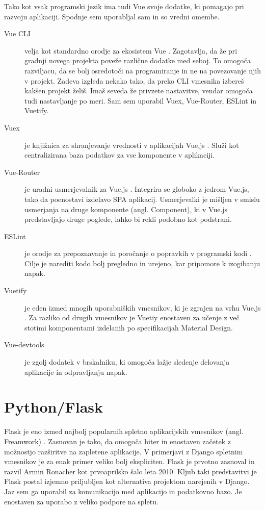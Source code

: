 \documentclass[a4paper, 12pt]{book}
\begin{document}
Tako kot vsak programski jezik ima tudi Vue svoje dodatke, ki pomagajo pri razvoju aplikaciji. Spodnje sem uporabljal sam in so vredni omembe.
\begin{description}
\item[Vue CLI] velja kot standardno orodje za ekosistem Vue \cite{VueCLI}. Zagotavlja, da že pri gradnji novega projekta poveže različne dodatke med seboj. To omogoča razviljacu, da se bolj osredotoči na programiranje in ne na povezovanje njih v projekt. Zadeva izgleda nekako tako, da preko CLI vmesnika izbereš kakšen projekt želiš. Imaš seveda že privzete nastavitve, vendar omogoča tudi nastavljanje po meri. Sam sem uporabil Vuex, Vue-Router, ESLint in Vuetify.
\item[Vuex] je knjižnica za shranjevanje vrednosti v aplikacijah Vue.js \cite{Vuex}. Služi kot centralizirana baza podatkov za vse komponente v aplikaciji. 
\item[Vue-Router] je uradni usmerjevalnik za Vue.js \cite{VueRouter}. Integrira se globoko z jedrom Vue.js, tako da poenostavi izdelavo SPA aplikacij. Usmerjevalki je mišljen v smislu usmerjanja na druge komponente (angl. Component), ki v Vue.js predstavljajo druge poglede, lahko bi rekli podobno kot podstrani.
\item[ESLint] je orodje za prepoznavanje in poročanje o popravkih v programski kodi \cite{ESLint}. Cilje je narediti kodo bolj pregledno in urejeno, kar pripomore k izogibanju napak.
\item[Vuetify] je eden izmed mnogih uporabniških vmesnikov, ki je zgrajen na vrhu Vue.js \cite{Vuetify}. Za razliko od drugih vmesnikov je Vuetiy enostaven za učenje z več stotimi komponentami izdelanih po specifikacijah Material Design.
\item[Vue-devtools] je zgolj dodatek v brskalniku, ki omogoča lažje sledenje delovanja aplikacije in odpravljanju napak. 
\end{description}


\section {Python/Flask}
Flask je eno izmed najbolj popularnih spletno aplikacijskih vmesnikov (angl. Freamwork) \cite{Flask}. Zasnovan je tako, da omogoča hiter in enostaven začetek z možnostjo razširitve na zapletene aplikacije. V primerjavi z Django spletnim vmesnikov je za enak primer veliko bolj ekspliciten. Flask je prvotno zasnoval in razvil Armin Ronacher kot prvoaprilsko šalo leta 2010. Kljub taki predstavitvi je Flask postal izjemno priljubljen kot alternativa projektom narejenih v Django. Jaz sem ga uporabil za komunikacijo med aplikacijo in podatkovno bazo. Je enostaven za uporabo z veliko podpore na spletu. 
\end{document}
